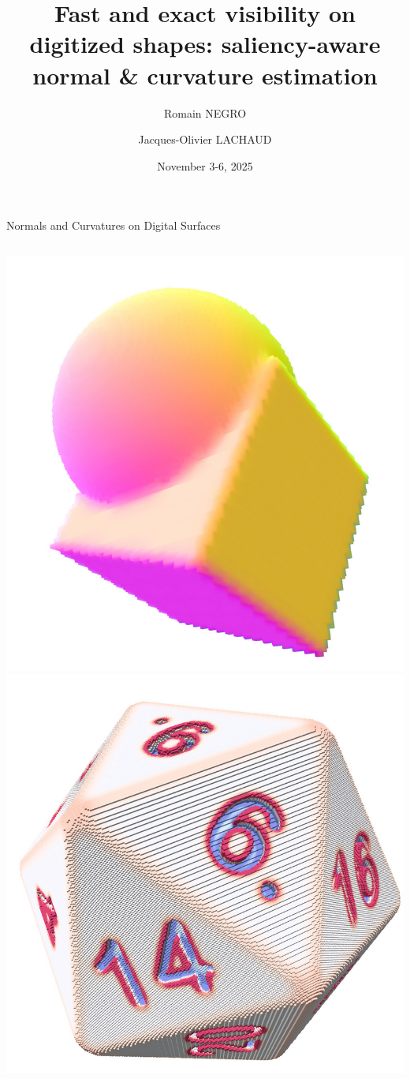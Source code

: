 \documentclass[11pt]{beamer}
\title[Visibility-based normals \& curvature]{Fast and exact visibility on digitized shapes: saliency-aware normal \& curvature estimation}
\author{Romain NEGRO \and Jacques-Olivier LACHAUD}
\institute{DGMM 2025}
\date{November 3-6, 2025}
\begin{document}
    \begin{frame}
        \titlepage
    \end{frame}

    \begin{frame}{Normals and Curvatures on Digital Surfaces}
        \centering
        \begin{columns}
            \includegraphics[width=\linewidth]{pictures/cps-VN-flat-small}
            \includegraphics[width=\linewidth]{pictures/d20-H-VN-small}
        \end{columns}
    \end{frame}
\end{document}
